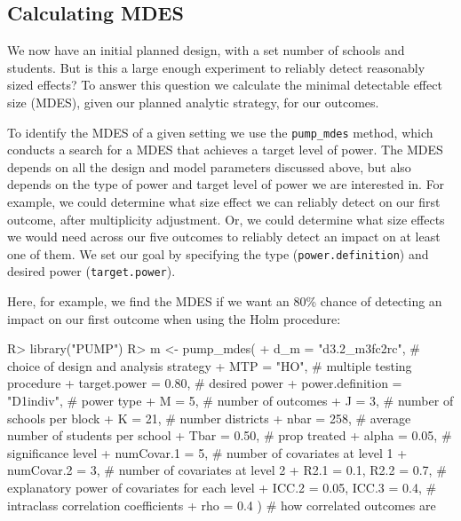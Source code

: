 \documentclass[
]{jss}
\begin{document}
\subsection{Calculating MDES}

We now have an initial planned design, with a set number of schools and
students. But is this a large enough experiment to reliably detect
reasonably sized effects? To answer this question we calculate the
minimal detectable effect size (MDES), given our planned analytic
strategy, for our outcomes.

To identify the MDES of a given setting we use the \texttt{pump\_mdes}
method, which conducts a search for a MDES that achieves a target level
of power. The MDES depends on all the design and model parameters
discussed above, but also depends on the type of power and target level
of power we are interested in. For example, we could determine what size
effect we can reliably detect on our first outcome, after multiplicity
adjustment. Or, we could determine what size effects we would need
across our five outcomes to reliably detect an impact on at least one of
them. We set our goal by specifying the type (\texttt{power.definition})
and desired power (\texttt{target.power}).

Here, for example, we find the MDES if we want an 80\% chance of
detecting an impact on our first outcome when using the Holm procedure:

\begin{CodeChunk}
\begin{CodeInput}
R> library("PUMP")
R> m <- pump_mdes(
+   d_m = "d3.2_m3fc2rc",         # choice of design and analysis strategy
+   MTP = "HO",                   # multiple testing procedure
+   target.power = 0.80,          # desired power
+   power.definition = "D1indiv", # power type
+   M = 5,                        # number of outcomes
+   J = 3,                        # number of schools per block
+   K = 21,                       # number districts
+   nbar = 258,                   # average number of students per school
+   Tbar = 0.50,                  # prop treated
+   alpha = 0.05,                 # significance level
+   numCovar.1 = 5,               # number of covariates at level 1
+   numCovar.2 = 3,               # number of covariates at level 2
+   R2.1 = 0.1, R2.2 = 0.7,       # explanatory power of covariates for each level
+   ICC.2 = 0.05, ICC.3 = 0.4,    # intraclass correlation coefficients
+   rho = 0.4 )                   # how correlated outcomes are
\end{CodeInput}
\end{CodeChunk}
\end{document}
